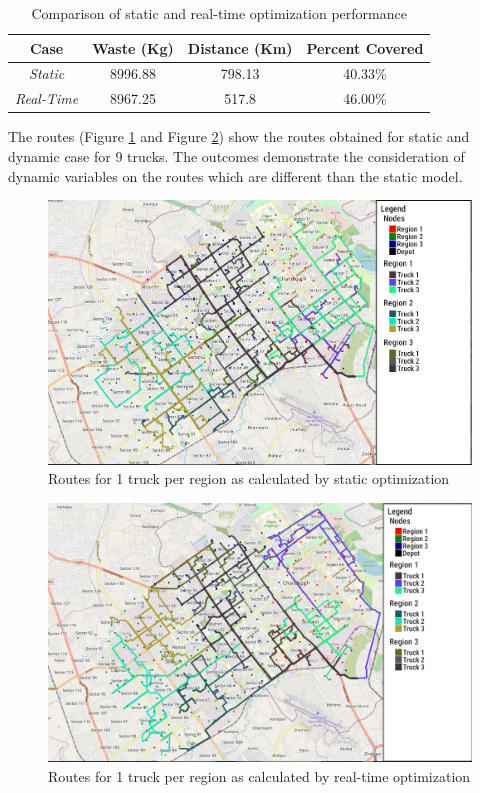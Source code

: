 \documentclass[12pt]{article}
\begin{document}
\begin{table}[H]
    \centering
    \caption{Comparison of static and real-time optimization performance} \label{tab5}
    \vspace*{0.3cm}
    \begin{tabular}{|c|c|c|c|}
        \hline Case & Waste (Kg) & Distance (Km) & Percent Covered\\
        \hline \textit{Static}& 8996.88 & 798.13 & 40.33\%\\
        \hline \textit{Real-Time}& 8967.25 & 517.8 & 46.00\%\\
        \hline
    \end{tabular}
\end{table}

The routes (Figure \ref{fig4} and Figure \ref{fig5}) show the routes obtained for static and dynamic case for 9 trucks. The outcomes demonstrate the consideration of dynamic variables on the routes which are different than the static model. 

\begin{figure}[H]
    \centering
    \includegraphics[scale=0.4]{Static_Weighted_3_Truck.png} %
    \caption{Routes for 1 truck per region as calculated by static optimization}\label{fig4}
\end{figure}
\begin{figure}[H]
    \centering
    \includegraphics[scale=0.4]{Dynamic_weighted_3_Truck.png} %
    \caption{Routes for 1 truck per region as calculated by real-time optimization}\label{fig5}
\end{figure}
\end{document}
